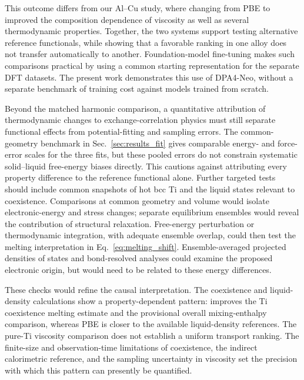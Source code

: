 This outcome differs from our Al--Cu study, where changing from PBE to \rscan{} improved the composition dependence of viscosity as well as several thermodynamic properties.\cite{Khazieva2024}
Together, the two systems support testing alternative reference functionals, while showing that a favorable ranking in one alloy does not transfer automatically to another.
Foundation-model fine-tuning makes such comparisons practical by using a common starting representation for the separate DFT datasets.
The present work demonstrates this use of DPA4-Neo, without a separate benchmark of training cost against models trained from scratch.

Beyond the matched harmonic comparison, a quantitative attribution of thermodynamic changes to exchange-correlation physics must still separate functional effects from potential-fitting and sampling errors.
The common-geometry benchmark in Sec.~\ref{sec:results_fit} gives comparable energy- and force-error scales for the three fits, but these pooled errors do not constrain systematic solid--liquid free-energy biases directly.
This cautions against attributing every property difference to the reference functional alone.
Further targeted tests should include common snapshots of hot bcc Ti and the liquid states relevant to coexistence.
Comparisons at common geometry and volume would isolate electronic-energy and stress changes; separate equilibrium ensembles would reveal the contribution of structural relaxation.
Free-energy perturbation or thermodynamic integration, with adequate ensemble overlap, could then test the melting interpretation in Eq.~\eqref{eq:melting_shift}.
Ensemble-averaged projected densities of states and bond-resolved analyses could examine the proposed electronic origin, but would need to be related to these energy differences.

These checks would refine the causal interpretation.
The coexistence and liquid-density calculations show a property-dependent pattern: \rscan{} improves the Ti coexistence melting estimate and the provisional overall mixing-enthalpy comparison, whereas PBE is closer to the available liquid-density references.
The pure-Ti viscosity comparison does not establish a uniform transport ranking.
The finite-size and observation-time limitations of coexistence, the indirect calorimetric reference, and the sampling uncertainty in viscosity set the precision with which this pattern can presently be quantified.
